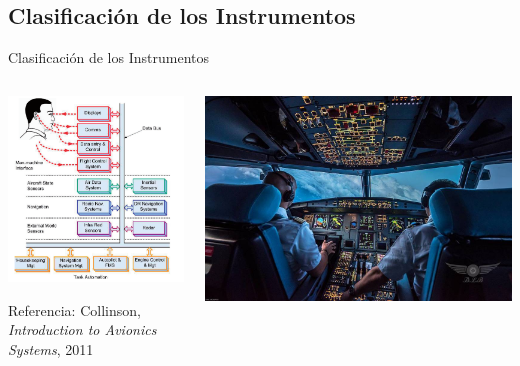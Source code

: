 \documentclass[10pt]{beamer}
\begin{document}
\subsection{Clasificaci\'on de los Instrumentos}
\label{sec:cap.1.2.clasificacion.instrumentos}

\begin{frame}{Clasificaci\'on de los Instrumentos}

  \begin{columns}
    \begin{column}{0.5\textwidth}
      \includegraphics[width=\linewidth]{imagenes/1.2.clasificacion.instrumentos/tipos_instrumentos.png}

      {\tiny Referencia: Collinson, {\it Introduction to Avionics
          Systems}, 2011 }
    \end{column}
  \begin{column}{0.5\textwidth}
    \includegraphics[width=\linewidth]{imagenes/1.2.clasificacion.instrumentos/glass_cockpit.jpg}
  \end{column}
  \end{columns}


\end{frame}
\end{document}
